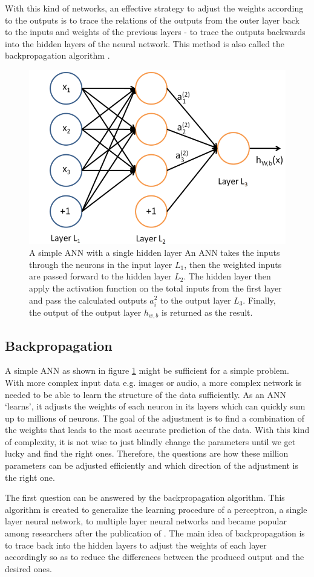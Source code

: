 With this kind of networks, an effective strategy to adjust the weights according to the outputs is to trace the relations of the outputs from the outer layer back to the inputs and weights of the previous layers - to trace the outputs backwards into the hidden layers of the neural network. This method is also called the backpropagation algorithm \cite{backprop1986}. 

\begin{figure}[tbh]
  \centering
    \includegraphics[width=0.5\linewidth]{abbildungen/annSimp.png}
  \caption{A simple ANN with a single hidden layer \cite{autoencoderSparse} An ANN takes the inputs through the neurons in the input layer $L_1$, then the weighted inputs are passed forward to the hidden layer $L_2$. The hidden layer then apply the activation function on the total inputs from the first layer and pass the calculated outputs $a_i^2$ to the output layer $L_3$. Finally, the output of the output layer $h_{w,b}$ is returned as the result.}
  \label{fig:annSimp}
\end{figure}

\subsection*{Backpropagation} \label{sec:backGD}
A simple ANN as shown  in figure \ref{fig:annSimp} might be sufficient for a simple problem. With more complex input data e.g. images or audio, a more complex network is needed to be able to learn the structure of the data sufficiently. As an ANN ‘learns’, it adjusts the weights of each neuron in its layers which can quickly sum up to millions of neurons. The goal of the adjustment is to find a combination of the weights that leads to the most accurate prediction of the data. With this kind of complexity, it is not wise to just blindly change the parameters until we get lucky and find the right ones. Therefore, the questions are how these million parameters can be adjusted efficiently and which direction of the adjustment is the right one.

The first question can be answered by the backpropagation algorithm. This algorithm is created to generalize the learning procedure of a perceptron, a single layer neural network, to multiple layer neural networks \cite{backpropagation} and became popular among researchers after the publication of \cite{backprop1986}. The main idea of backpropagation is to trace back into the hidden layers to adjust the weights of each layer accordingly so as to reduce the differences between the produced output and the desired ones. 

